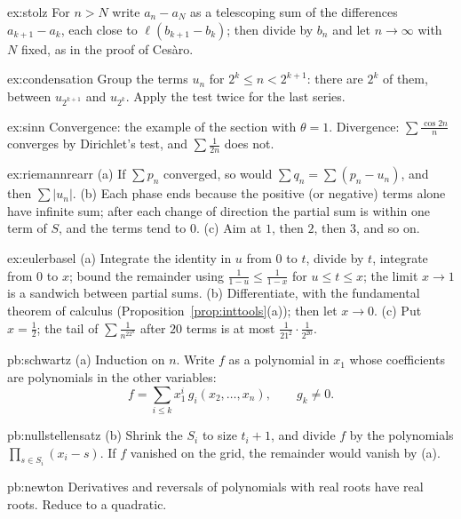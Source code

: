 \begin{hint}{ex:stolz}
For $n>N$ write $a_n-a_N$ as a telescoping sum of the differences $a_{k+1}-a_k$, each close to $\ell(b_{k+1}-b_k)$; then divide by $b_n$ and let $n\to\infty$ with $N$ fixed, as in the proof of Ces\`aro.
\end{hint}
\begin{hint}{ex:condensation}
Group the terms $u_n$ for $2^k\le n<2^{k+1}$: there are $2^k$ of them, between $u_{2^{k+1}}$ and $u_{2^k}$. Apply the test twice for the last series.
\end{hint}
\begin{hint}{ex:sinn}
Convergence: the example of the section with $\theta=1$. Divergence: $\sum\frac{\cos2n}n$ converges by Dirichlet's test, and $\sum\frac1{2n}$ does not.
\end{hint}
\begin{hint}{ex:riemannrearr}
(a) If $\sum p_n$ converged, so would $\sum q_n=\sum(p_n-u_n)$, and then $\sum|u_n|$. (b) Each phase ends because the positive (or negative) terms alone have infinite sum; after each change of direction the partial sum is within one term of $S$, and the terms tend to $0$. (c) Aim at $1$, then $2$, then $3$, and so on.
\end{hint}
\begin{hint}{ex:eulerbasel}
(a) Integrate the identity in $u$ from $0$ to $t$, divide by $t$, integrate from $0$ to $x$; bound the remainder using $\frac1{1-u}\le\frac1{1-x}$ for $u\le t\le x$; the limit $x\to1$ is a sandwich between partial sums. (b) Differentiate, with the fundamental theorem of calculus (Proposition~\ref{prop:inttools}(a)); then let $x\to0$. (c) Put $x=\frac12$; the tail of $\sum\frac1{n^22^n}$ after $20$ terms is at most $\frac1{21^2}\cdot\frac1{2^{20}}$.
\end{hint}

\begin{hint}{pb:schwartz}
(a) Induction on $n$. Write $f$ as a polynomial in $x_1$ whose coefficients are polynomials in the other variables:
\[
f=\sum_{i\le k}x_1^i\,g_i(x_2,\dots,x_n),\qquad g_k\ne0.
\]
\end{hint}

\begin{hint}{pb:nullstellensatz}
(b) Shrink the $S_i$ to size $t_i+1$, and divide $f$ by the polynomials $\prod_{s\in S_i}(x_i-s)$. If $f$ vanished on the grid, the
remainder would vanish by (a).
\end{hint}

\begin{hint}{pb:newton}
Derivatives and reversals of polynomials with real roots have real roots. Reduce to a quadratic.
\end{hint}

